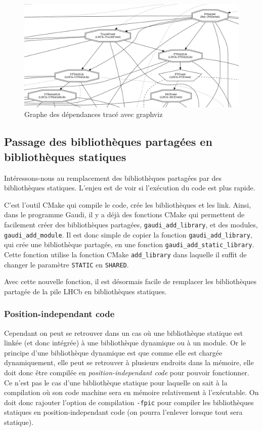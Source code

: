 \documentclass[a4paper,11pt]{report}
\begin{document}
\begin{figure}[H]
    \includegraphics[width=\textwidth]{graphviz_cropped.png}
    \caption{Graphe des dépendances tracé avec graphviz}
    \label{Graphviz}
\end{figure}

\subsection{Passage des bibliothèques partagées en bibliothèques statiques}
Intéressons-nous au remplacement des bibliothèques partagées par des bibliothèques statiques.
L'enjeu est de voir si l'exécution du code est plus rapide.

C'est l'outil CMake qui compile le code, crée les bibliothèques et les link.
Ainsi, dans le programme Gaudi, il y a déjà des fonctions CMake qui permettent de facilement créer des bibliothèques partagées, \verb'gaudi_add_library', et des modules, \verb'gaudi_add_module'.
Il est donc simple de copier la fonction \verb'gaudi_add_library', qui crée une bibliothèque partagée, en une fonction \verb'gaudi_add_static_library'.
Cette fonction utilise la fonction CMake \verb'add_library' dans laquelle il suffit de changer le paramètre \verb'STATIC' en \verb'SHARED'.

Avec cette nouvelle fonction, il est désormais facile de remplacer les bibliothèques partagée de la pile LHCb en bibliothèques statiques.

\subsubsection{Position-independant code}
Cependant on peut se retrouver dans un cas où une bibliothèque statique est linkée (et donc intégrée) à une bibliothèque dynamique ou à un module.
Or le principe d'une bibliothèque dynamique est que comme elle est chargée dynamiquement, elle peut se retrouver à plusieurs endroits dans la mémoire, elle doit donc être compilée en \emph{position-independant code} pour pouvoir fonctionner.
Ce n'est pas le cas d'une bibliothèque statique pour laquelle on sait à la compilation où son code machine sera en mémoire relativement à l'exécutable.
On doit donc rajouter l'option de compilation \verb'-fpic' pour compiler les bibliothèques statiques en position-independant code (on pourra l'enlever lorsque tout sera statique).
\end{document}
